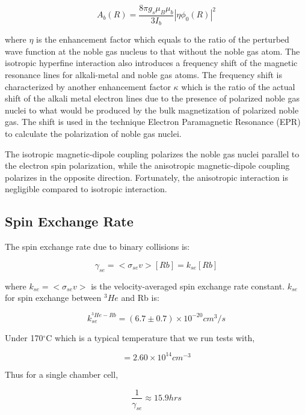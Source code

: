 \begin{equation}
A_{b}(R)=\frac{8\pi g_{s}\mu_{B}\mu_{b}}{3I_{b}}|\eta \phi_{0}(R)|^{2}
\end{equation}

where $\eta$ is the enhancement factor which equals to the ratio of the perturbed wave function at the noble gas nucleus to that without the noble gas atom. The isotropic hyperfine interaction also introduces a frequency shift of the magnetic resonance lines for alkali-metal and noble gas atoms. The frequency shift is characterized by another enhancement factor $\kappa$ which is the ratio of the actual shift of the alkali metal electron lines due to the presence of polarized noble gas nuclei to what would be produced by the bulk magnetization of polarized noble gas. The shift is used in the technique Electron Paramagnetic Resonance (EPR) to calculate the polarization of noble gas nuclei.

The isotropic magnetic-dipole coupling polarizes the noble gas nuclei parallel to the electron spin polarization, while the anisotropic magnetic-dipole coupling polarizes in the opposite direction. Fortunately, the anisotropic interaction is negligible compared to isotropic interaction.

\subsection{Spin Exchange Rate}

The spin exchange rate due to binary collisions is:

\begin{equation}
\gamma_{se}=<\sigma_{se}v>[Rb]=k_{se}[Rb]
\end{equation}

where $k_{se}=<\sigma_{se}v>$ is the velocity-averaged spin exchange rate constant. $k_{se}$ for spin exchange between $^{3}He$ and Rb is:

\begin{equation}
k_{se}^{^{3}He-Rb}=(6.7\pm 0.7)\times 10^{-20}cm^{3}/s
\end{equation}

Under 170$^{\circ}$C which is a typical temperature that we run tests with,

\begin{equation}
[Rb]=2.60\times 10^{14}cm^{-3}
\end{equation}

Thus for a single chamber cell,

\begin{equation}
\frac{1}{\gamma_{se}}\approx 15.9 hrs
\end{equation}

